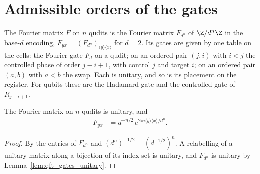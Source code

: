 \section{Admissible orders of the gates}
\label{sec:qft_orders}

\begin{definition}
    \label{def:qft_gate_table}
    \leanok
    The Fourier matrix $F$ on $n$ qudits is the Fourier matrix $F_{d^n}$ of
    $\Z/d^n\Z$ in the base-$d$ encoding, $F_{yx}=(F_{d^n})_{\langle y\rangle\langle x\rangle}$
    \cite[eq.~(5.2)]{NielsenChuang2010} for $d=2$. Its gates are given by one table on
    the cells: the Fourier gate $F_d$ on a qudit; on an ordered pair $(j,i)$ with $i<j$
    the controlled phase of order $j-i+1$, with control $j$ and target $i$; on an
    ordered pair $(a,b)$ with $a<b$ the swap. Each is unitary, and so is its placement
    on the register. For qubits these are the Hadamard gate and the controlled gate of
    $R_{j-i+1}$.
\end{definition}

\begin{lemma}
    \label{lem:qft_dft}
    \leanok
    The Fourier matrix on $n$ qudits is unitary, and
    \begin{align}
        F_{yx}&=d^{-n/2}\,e^{2\pi i\langle y\rangle\langle x\rangle/d^n}.
        \label{eq:qft_dft_entries}
    \end{align}
\end{lemma}
\begin{proof}\leanok
    By the entries of $F_{d^n}$ and $(d^n)^{-1/2}=(d^{-1/2})^n$. A relabelling of a unitary
    matrix along a bijection of its index set is unitary, and $F_{d^n}$ is unitary by
    Lemma~\ref{lem:qft_gates_unitary}.
\end{proof}

